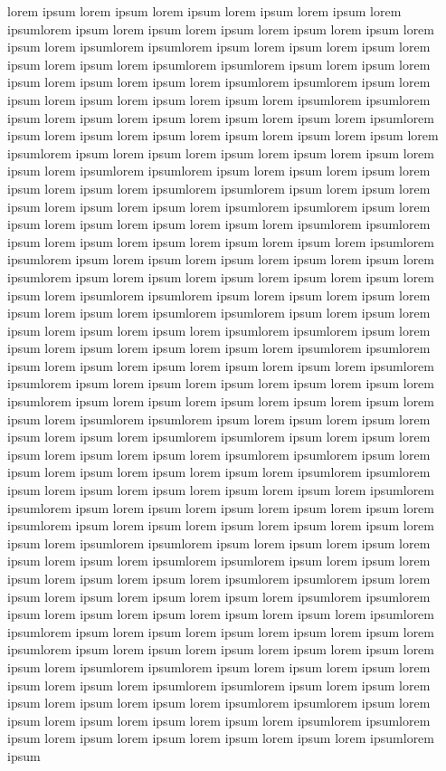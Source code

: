 lorem ipsum lorem ipsum lorem ipsum lorem ipsum lorem ipsum lorem ipsumlorem ipsum lorem ipsum lorem ipsum lorem ipsum lorem ipsum lorem ipsum lorem ipsumlorem ipsumlorem ipsum lorem ipsum lorem ipsum lorem ipsum lorem ipsum lorem ipsumlorem ipsumlorem ipsum lorem ipsum lorem ipsum lorem ipsum lorem ipsum lorem ipsumlorem ipsumlorem ipsum lorem ipsum lorem ipsum lorem ipsum lorem ipsum lorem ipsumlorem ipsumlorem ipsum lorem ipsum lorem ipsum lorem ipsum lorem ipsum lorem ipsumlorem ipsum lorem ipsum lorem ipsum lorem ipsum lorem ipsum lorem ipsum lorem ipsumlorem ipsum lorem ipsum lorem ipsum lorem ipsum lorem ipsum lorem ipsum lorem ipsumlorem ipsumlorem ipsum lorem ipsum lorem ipsum lorem ipsum lorem ipsum lorem ipsumlorem ipsumlorem ipsum lorem ipsum lorem ipsum lorem ipsum lorem ipsum lorem ipsumlorem ipsumlorem ipsum lorem ipsum lorem ipsum lorem ipsum lorem ipsum lorem ipsumlorem ipsumlorem ipsum lorem ipsum lorem ipsum lorem ipsum lorem ipsum lorem ipsumlorem ipsumlorem ipsum lorem ipsum lorem ipsum lorem ipsum lorem ipsum lorem ipsumlorem ipsum lorem ipsum lorem ipsum lorem ipsum lorem ipsum lorem ipsum lorem ipsumlorem ipsumlorem ipsum lorem ipsum lorem ipsum lorem ipsum lorem ipsum lorem ipsumlorem ipsumlorem ipsum lorem ipsum lorem ipsum lorem ipsum lorem ipsum lorem ipsumlorem ipsumlorem ipsum lorem ipsum lorem ipsum lorem ipsum lorem ipsum lorem ipsumlorem ipsumlorem ipsum lorem ipsum lorem ipsum lorem ipsum lorem ipsum lorem ipsumlorem ipsumlorem ipsum lorem ipsum lorem ipsum lorem ipsum lorem ipsum lorem ipsumlorem ipsum lorem ipsum lorem ipsum lorem ipsum lorem ipsum lorem ipsum lorem ipsumlorem ipsumlorem ipsum lorem ipsum lorem ipsum lorem ipsum lorem ipsum lorem ipsumlorem ipsumlorem ipsum lorem ipsum lorem ipsum lorem ipsum lorem ipsum lorem ipsumlorem ipsumlorem ipsum lorem ipsum lorem ipsum lorem ipsum lorem ipsum lorem ipsumlorem ipsumlorem ipsum lorem ipsum lorem ipsum lorem ipsum lorem ipsum lorem ipsumlorem ipsumlorem ipsum lorem ipsum lorem ipsum lorem ipsum lorem ipsum lorem ipsumlorem ipsum lorem ipsum lorem ipsum lorem ipsum lorem ipsum lorem ipsum lorem ipsumlorem ipsumlorem ipsum lorem ipsum lorem ipsum lorem ipsum lorem ipsum lorem ipsumlorem ipsumlorem ipsum lorem ipsum lorem ipsum lorem ipsum lorem ipsum lorem ipsumlorem ipsumlorem ipsum lorem ipsum lorem ipsum lorem ipsum lorem ipsum lorem ipsumlorem ipsumlorem ipsum lorem ipsum lorem ipsum lorem ipsum lorem ipsum lorem ipsumlorem ipsumlorem ipsum lorem ipsum lorem ipsum lorem ipsum lorem ipsum lorem ipsumlorem ipsum lorem ipsum lorem ipsum lorem ipsum lorem ipsum lorem ipsum lorem ipsumlorem ipsumlorem ipsum lorem ipsum lorem ipsum lorem ipsum lorem ipsum lorem ipsumlorem ipsumlorem ipsum lorem ipsum lorem ipsum lorem ipsum lorem ipsum lorem ipsumlorem ipsumlorem ipsum lorem ipsum lorem ipsum lorem ipsum lorem ipsum lorem ipsumlorem ipsumlorem ipsum lorem ipsum lorem ipsum lorem ipsum lorem ipsum lorem ipsumlorem ipsum


